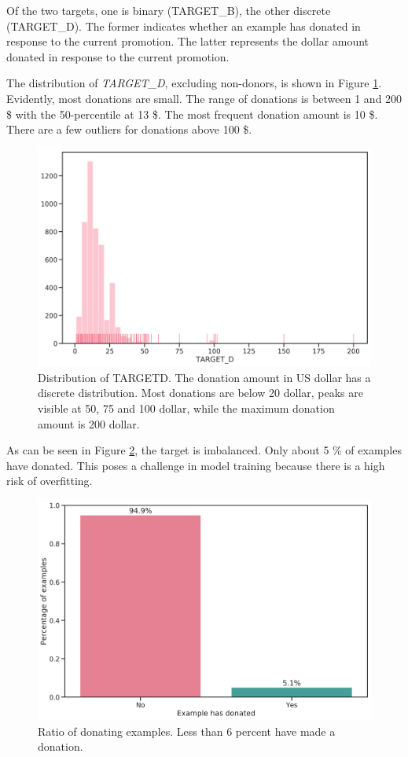 \documentclass[
  11pt,
  a4paper,
  DIV=12,captions=tableheading,oneside]{scrbook}
\begin{document}
Of the two targets, one is binary (TARGET\_B), the other discrete (TARGET\_D). The former indicates whether an example has donated in response to the current promotion. The latter represents the dollar amount donated in response to the current promotion.

The distribution of \emph{TARGET\_D}, excluding non-donors, is shown in Figure \ref{fig:target-distrib}. Evidently, most donations are small. The range of donations is between 1 and 200 \$ with the 50-percentile at 13 \$. The most frequent donation amount is 10 \$. There are a few outliers for donations above 100 \$.

\begin{figure}

{\centering \includegraphics[width=0.7\linewidth]{figures/eda/target-distribution} 

}

\caption{Distribution of TARGETD. The donation amount in US dollar has a discrete distribution. Most donations are below 20 dollar, peaks are visible at 50, 75 and 100 dollar, while the maximum donation amount is 200 dollar.}\label{fig:target-distrib}
\end{figure}

As can be seen in Figure \ref{fig:target-ratio}, the target is imbalanced. Only about 5 \% of examples have donated. This poses a challenge in model training because there is a high risk of overfitting.

\begin{figure}

{\centering \includegraphics[width=0.7\linewidth]{figures/eda/ratio-binary} 

}

\caption{Ratio of donating examples. Less than 6 percent have made a donation.}\label{fig:target-ratio}
\end{figure}
\end{document}
